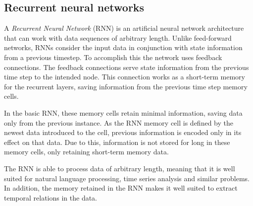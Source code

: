 \subsection{Recurrent neural networks}
\label{section:BT:RNN}

A \textit{Recurrent Neural Network} (RNN) is an artificial neural network architecture that can work with data sequences of arbitrary length.
Unlike feed-forward networks, RNNs consider the input data in conjunction with state information from a previous timestep.
To accomplish this the network uses feedback connections.
The feedback connections serve state information from the previous time step to the intended node.
This connection works as a short-term memory for the recurrent layers, saving information from the previous time step memory cells.

In the basic RNN, these memory cells retain minimal information, saving data only from the previous instance.
As the RNN memory cell is defined by the newest data introduced to the cell, previous information is encoded only in its effect on that data.
Due to this, information is not stored for long in these memory cells, only retaining short-term memory data.



The RNN is able to process data of arbitrary length, meaning that it is well suited for natural language processing, time series analysis and similar problems.
In addition, the memory retained in the RNN makes it well suited to extract temporal relations in the data.


